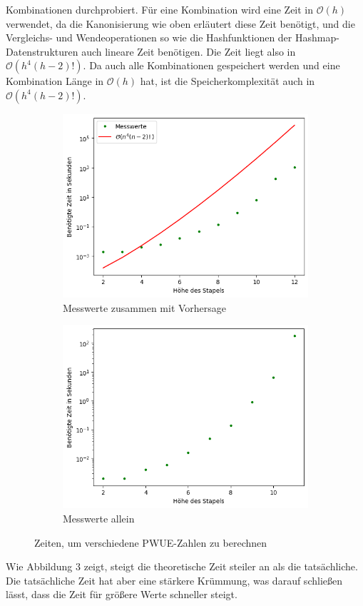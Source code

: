 \documentclass[a4paper,10pt,ngerman]{scrartcl}
\begin{document}
  Kombinationen durchprobiert. Für eine Kombination wird eine Zeit in $\mathcal{O}(h)$ verwendet, da die Kanonisierung wie oben erläutert
  diese Zeit benötigt, und die Vergleichs- und Wendeoperationen so wie die Hashfunktionen der Hashmap-Datenstrukturen auch lineare Zeit benötigen.
  Die Zeit liegt also in $\mathcal{O}(h^4(h-2)!)$. Da auch alle Kombinationen gespeichert werden und eine Kombination Länge in $\mathcal{O}(h)$ hat,
  ist die Speicherkomplexität auch in $\mathcal{O}(h^4(h-2)!)$. \\
  \begin{figure}
    \centering
    \begin{subfigure}{.5\textwidth}
      \centering
      \includegraphics[width=1\linewidth]{pwue-hoehe-bigo.png}
      \caption{Messwerte zusammen mit Vorhersage}
      \label{fig:sub1}
    \end{subfigure}%
    \begin{subfigure}{.5\textwidth}
      \centering
      \includegraphics[width=1\linewidth]{pwue-hoehe.png}
      \caption{Messwerte allein}
      \label{fig:sub2}
    \end{subfigure}
    \caption{Zeiten, um verschiedene PWUE-Zahlen zu berechnen}
    \label{fig:test}
  \end{figure}
  Wie Abbildung 3 zeigt, steigt die theoretische Zeit steiler an als die tatsächliche. Die tatsächliche Zeit hat aber eine stärkere Krümmung, was darauf
  schließen lässt, dass die Zeit für größere Werte schneller steigt.
\end{document}
